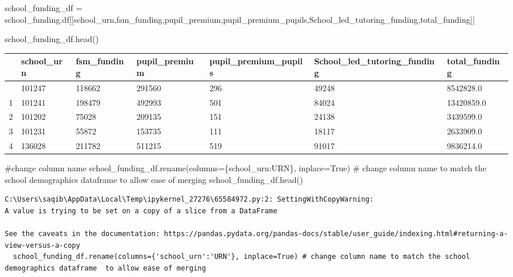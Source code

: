 \documentclass[
  letterpaper,
  DIV=11,
  numbers=noendperiod]{scrartcl}
\newenvironment{Shaded}{\begin{snugshade}}{\end{snugshade}}
\newcommand{\CommentTok}[1]{\textcolor[rgb]{0.37,0.37,0.37}{#1}}
\newcommand{\NormalTok}[1]{\textcolor[rgb]{0.00,0.23,0.31}{#1}}
\newcommand{\OperatorTok}[1]{\textcolor[rgb]{0.37,0.37,0.37}{#1}}
\newcommand{\StringTok}[1]{\textcolor[rgb]{0.13,0.47,0.30}{#1}}
\newcommand{\VariableTok}[1]{\textcolor[rgb]{0.07,0.07,0.07}{#1}}
\begin{document}
\begin{Shaded}
\begin{Highlighting}[]
\NormalTok{school\_funding\_df }\OperatorTok{=}\NormalTok{ school\_funding.df[[}\StringTok{\textquotesingle{}school\_urn\textquotesingle{}}\NormalTok{,}\StringTok{\textquotesingle{}fsm\_funding\textquotesingle{}}\NormalTok{,}\StringTok{\textquotesingle{}pupil\_premium\textquotesingle{}}\NormalTok{,}\StringTok{\textquotesingle{}pupil\_premium\_pupils\textquotesingle{}}\NormalTok{,}\StringTok{\textquotesingle{}School\_led\_tutoring\_funding\textquotesingle{}}\NormalTok{,}\StringTok{\textquotesingle{}total\_funding\textquotesingle{}}\NormalTok{]]}

\NormalTok{school\_funding\_df.head()}

\end{Highlighting}
\end{Shaded}

\begin{longtable}[]{@{}lllllll@{}}
\toprule\noalign{}
& school\_urn & fsm\_funding & pupil\_premium & pupil\_premium\_pupils &
School\_led\_tutoring\_funding & total\_funding \\
\midrule\noalign{}
\endhead
\bottomrule\noalign{}
\endlastfoot
0 & 101247 & 118662 & 291560 & 296 & 49248 & 8542828.0 \\
1 & 101241 & 198479 & 492993 & 501 & 84024 & 13420859.0 \\
2 & 101202 & 75028 & 209135 & 151 & 24138 & 3439599.0 \\
3 & 101231 & 55872 & 153735 & 111 & 18117 & 2633909.0 \\
4 & 136028 & 211782 & 511215 & 519 & 91017 & 9836214.0 \\
\end{longtable}

\begin{Shaded}
\begin{Highlighting}[]
\CommentTok{\#change column name}
\NormalTok{school\_funding\_df.rename(columns}\OperatorTok{=}\NormalTok{\{}\StringTok{\textquotesingle{}school\_urn\textquotesingle{}}\NormalTok{:}\StringTok{\textquotesingle{}URN\textquotesingle{}}\NormalTok{\}, inplace}\OperatorTok{=}\VariableTok{True}\NormalTok{) }\CommentTok{\# change column name to match the school demographics dataframe  to allow ease of merging }
\NormalTok{school\_funding\_df.head()}
\end{Highlighting}
\end{Shaded}

\begin{verbatim}
C:\Users\saqib\AppData\Local\Temp\ipykernel_27276\65584972.py:2: SettingWithCopyWarning: 
A value is trying to be set on a copy of a slice from a DataFrame

See the caveats in the documentation: https://pandas.pydata.org/pandas-docs/stable/user_guide/indexing.html#returning-a-view-versus-a-copy
  school_funding_df.rename(columns={'school_urn':'URN'}, inplace=True) # change column name to match the school demographics dataframe  to allow ease of merging
\end{verbatim}
\end{document}
